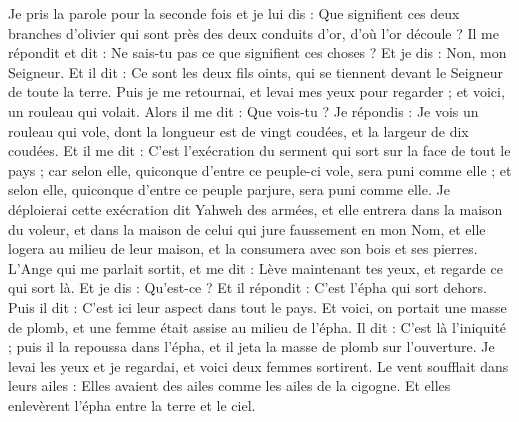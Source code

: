 \begin{multicols}{2}
Je pris la parole pour la seconde fois et je lui dis : Que signifient ces deux branches d'olivier qui sont près des deux conduits d'or, d'où l'or découle ?
Il me répondit et dit : Ne sais-tu pas ce que signifient ces choses ? Et je dis : Non, mon Seigneur.
Et il dit : Ce sont les deux fils oints, qui se tiennent devant le Seigneur de toute la terre.
\VerseOne{}Puis je me retournai, et levai mes yeux pour regarder ; et voici, un rouleau qui volait.
Alors il me dit : Que vois-tu ? Je répondis : Je vois un rouleau qui vole, dont la longueur est de vingt coudées, et la largeur de dix coudées.
Et il me dit : C'est l'exécration du serment qui sort sur la face de tout le pays ; car selon elle, quiconque d'entre ce peuple-ci vole, sera puni comme elle ; et selon elle, quiconque d'entre ce peuple parjure, sera puni comme elle.
Je déploierai cette exécration dit Yahweh des armées, et elle entrera dans la maison du voleur, et dans la maison de celui qui jure faussement en mon Nom, et elle logera au milieu de leur maison, et la consumera avec son bois et ses pierres.
L'Ange qui me parlait sortit, et me dit : Lève maintenant tes yeux, et regarde ce qui sort là.
Et je dis : Qu'est-ce ? Et il répondit : C'est l'épha qui sort dehors. Puis il dit : C'est ici leur aspect dans tout le pays.
Et voici, on portait une masse de plomb, et une femme était assise au milieu de l'épha.
Il dit : C'est là l'iniquité ; puis il la repoussa dans l'épha, et il jeta la masse de plomb sur l'ouverture.
Je levai les yeux et je regardai, et voici deux femmes sortirent. Le vent soufflait dans leurs ailes : Elles avaient des ailes comme les ailes de la cigogne. Et elles enlevèrent l'épha entre la terre et le ciel.

\end{multicols}
